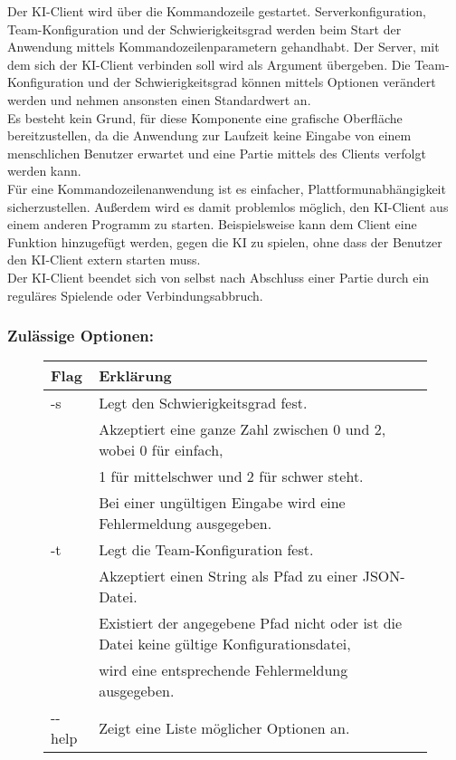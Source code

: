 Der KI-Client wird über die Kommandozeile gestartet. Serverkonfiguration, Team-Konfiguration und der Schwierigkeitsgrad werden beim Start der Anwendung mittels Kommandozeilenparametern gehandhabt. Der Server, mit dem sich der KI-Client verbinden soll wird als Argument übergeben. Die Team-Konfiguration und der Schwierigkeitsgrad können mittels Optionen verändert werden und nehmen ansonsten einen Standardwert an.\\
Es besteht kein Grund, für diese Komponente eine grafische Oberfläche bereitzustellen, da die Anwendung zur Laufzeit keine Eingabe von einem menschlichen Benutzer erwartet und eine Partie mittels des Clients verfolgt werden kann. \\
Für eine Kommandozeilenanwendung ist es einfacher, Plattformunabhängigkeit sicherzustellen. Außerdem wird es damit problemlos möglich, den KI-Client aus einem anderen Programm zu starten. Beispielsweise kann dem Client eine Funktion hinzugefügt werden, gegen die KI zu spielen, ohne dass der Benutzer den KI-Client extern starten muss.\\
Der KI-Client beendet sich von selbst nach Abschluss einer Partie durch ein reguläres Spielende oder Verbindungsabbruch.\\

\subsubsection{Zulässige Optionen:}
\begin{figure}[H]
    \centering
    \begin{tabular}{|p{2cm}|p{12cm} |}
        \hline
        Flag & Erklärung \\\hline
        -s & Legt den Schwierigkeitsgrad fest.\\
        & Akzeptiert eine ganze Zahl zwischen 0 und 2, wobei 0 für einfach,\\
        & 1 für mittelschwer und 2 für schwer steht.\\
        & Bei einer ungültigen Eingabe wird eine Fehlermeldung ausgegeben.\\\hline
        -t & Legt die Team-Konfiguration fest.\\
        & Akzeptiert einen String als Pfad zu einer JSON-Datei.\\
        & Existiert der angegebene Pfad nicht oder ist die Datei keine gültige Konfigurationsdatei,\\
        & wird eine entsprechende Fehlermeldung ausgegeben.\\\hline
        -{}-help & Zeigt eine Liste möglicher Optionen an.\\\hline
    \end{tabular}
\end{figure}
